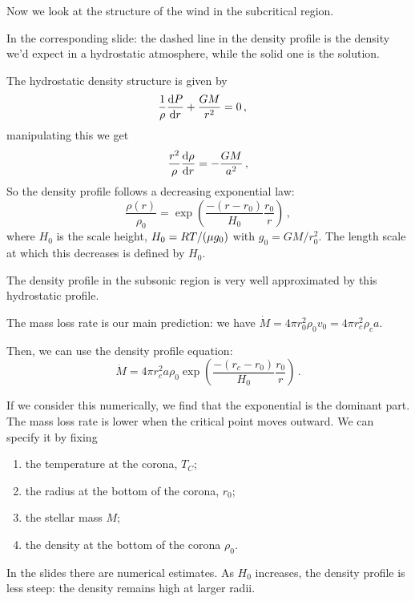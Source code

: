 \documentclass[main.tex]{subfiles}
\begin{document}
Now we look at the structure of the wind in the subcritical region.

In the corresponding slide: the dashed line in the density profile is the density we'd expect in a hydrostatic atmosphere, while the solid one is the solution.

The hydrostatic density structure is given by 
%
\begin{subequations}
\begin{align}
  \frac{1}{\rho } \dv{P}{r}  +\frac{GM }{r^2}  &= 0 
\,,
\end{align}
\end{subequations}
%
manipulating this we get 
%
\begin{equation}
  \frac{r^2}{\rho } \dv{\rho }{r} = - \frac{GM}{a^2}
\,,
\end{equation}
%
So the density profile follows a decreasing exponential law: 
%
\begin{equation}
  \frac{\rho (r)}{\rho_0 } = \exp(\frac{-(r-r_0 )}{H_0 } \frac{r_0}{r} ) 
\,,
\end{equation}
%
where \(H_0 \) is the scale height, \(H_0 = RT / \qty(\mu g_0 )\) with \(g_0 = GM / r_0^2\).
The length scale at which this decreases is defined by \(H_0 \). 

The density profile in the subsonic region is very well approximated by this hydrostatic profile.

The mass loss rate is our main prediction: we have \(\dot{M } = 4 \pi r^2_0 \rho_0 v_0 = 4 \pi r_c^2\rho_c a\).

Then, we can use the density profile equation: 
%
\begin{equation}
  \dot{M} = 4 \pi r_c^2 a \rho_0 \exp(\frac{-(r_c - r_0 )}{H_0 } \frac{r_0 }{r}) 
\,.
\end{equation}
%

If we consider this numerically, we find that the exponential is the dominant part.
The mass loss rate is lower when the critical point moves outward.
We can specify it by fixing 
%
\begin{enumerate}
    \item the temperature at the corona, \(T_C\);
    \item the radius at the bottom of the corona, \(r_0 \);
    \item the stellar mass \(M\);
    \item the density at the bottom of the corona \(\rho_0 \).
\end{enumerate}

In the slides there are numerical estimates. 
As \(H_0 \) increases, the density profile is less steep: the density remains high at larger radii.
\end{document}
